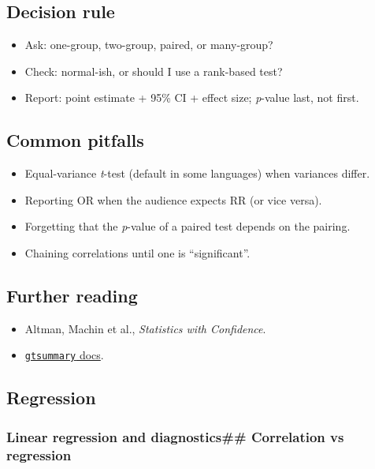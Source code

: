 \documentclass[
]{article}
\providecommand{\tightlist}{%
  \setlength{\itemsep}{0pt}\setlength{\parskip}{0pt}}
\begin{document}
\subsection{Decision rule}\label{decision-rule-3}

\begin{itemize}
\tightlist
\item
  Ask: one-group, two-group, paired, or many-group?
\item
  Check: normal-ish, or should I use a rank-based test?
\item
  Report: point estimate + 95\% CI + effect size; \emph{p}-value last,
  not first.
\end{itemize}

\subsection{Common pitfalls}\label{common-pitfalls-3}

\begin{itemize}
\tightlist
\item
  Equal-variance \emph{t}-test (default in some languages) when
  variances differ.
\item
  Reporting OR when the audience expects RR (or vice versa).
\item
  Forgetting that the \emph{p}-value of a paired test depends on the
  pairing.
\item
  Chaining correlations until one is ``significant''.
\end{itemize}

\subsection{Further reading}\label{further-reading-3}

\begin{itemize}
\tightlist
\item
  Altman, Machin et al., \emph{Statistics with Confidence}.
\item
  \href{https://www.danieldsjoberg.com/gtsummary/}{\texttt{gtsummary}
  docs}.
\end{itemize}

\subsection{Regression}\label{regression}

\subsubsection{Linear regression and diagnostics\#\# Correlation vs
regression}\label{linear-regression-and-diagnostics-correlation-vs-regression}
\end{document}
